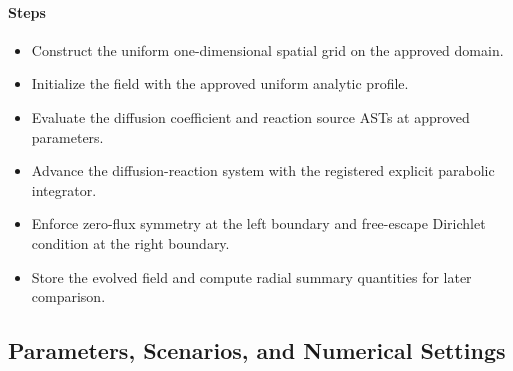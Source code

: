 \documentclass[11pt]{article}
\begin{document}
\paragraph{Steps}
\begin{itemize}\raggedright
\item Construct the uniform one-dimensional spatial grid on the approved domain.
\item Initialize the field with the approved uniform analytic profile.
\item Evaluate the diffusion coefficient and reaction source ASTs at approved parameters.
\item Advance the diffusion-reaction system with the registered explicit parabolic integrator.
\item Enforce zero-flux symmetry at the left boundary and free-escape Dirichlet condition at the right boundary.
\item Store the evolved field and compute radial summary quantities for later comparison.
\end{itemize}

\subsection{Parameters, Scenarios, and Numerical Settings}
\end{document}

